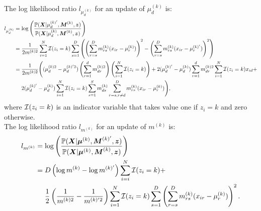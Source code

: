 \documentclass[a4paper,11pt]{article}
\def\M{\boldsymbol{M}}
\def\X{\boldsymbol{X}}
\def\bmu{\boldsymbol{\mu}}
\def\p{\mathbb{P}}
\begin{document}
The log likelihood ratio $l_{\mu_d^{(k)}}$ for an update of $\mu_d^{(k)}$ is:
\begin{align*}
l_{\mu_d^{(k)}} &= \log \left( \frac{\p(\X | \mu_d^{(k)'}, \M^{(k)}, \boldsymbol z )}{\p(\X | \mu_d^{(k)}, \M^{(k)}, \boldsymbol z )} \right) \\
&= \frac{1}{2m^{(k)2}}\sum_{i=1}^N {\cal I}(z_i = k) \sum_{s = 1}^{D}\left( \left(\sum_{r = s}^{D}m_{rs}^{(k)} (x_{ir} - \mu_r^{(k)}) \right)^2- \left(\sum_{r = s}^{D}m_{rs}^{(k)} (x_{ir} - \mu_r^{(k)'}) \right)^2 \right)\\
&= \begin{aligned}[t]
& \frac{1}{2m^{(k)2}}\Bigg((\mu_d^{(k)2} - \mu_d^{(k)'2}) \left( \sum_{r=1}^{d} m_{dr}^{(k)2} \right) \left(\sum_{i=1}^N {\cal I}(z_i = k)\right) +
 2(\mu_d^{(k)'} -\mu_d^{(k)}) \sum_{r=1}^d m_{dr}^{(k)2} \sum_{i=1}^N {\cal I}(z_i = k) x_{id} + \\
&   2(\mu_d^{(k)'} -\mu_d^{(k)}) \sum_{i=1}^N {\cal I}(z_i = k) \sum_{s=1}^{S} m_{ds}^{(k)} \sum_{r=s, r \neq d}^{D} m_{rs}^{(k)}(x_{ir} - \mu_r^{(k)}) \Bigg),
 \end{aligned}
\end{align*}
where ${\cal I}(z_i = k)$ is an indicator variable that takes value one if $z_i = k$ and zero otherwise.\\
The log likelihood ratio $l_{m^{(k)}}$ for an update of $m^{(k)}$ is:
\begin{align*}
l_{m^{(k)}} &= \log \left( \frac{\p(\X | \bmu^{(k)}, \M^{(k)'}, \boldsymbol z )}{\p(\X | \bmu^{(k)}, \M^{(k)}, \boldsymbol z )} \right) \\
 &= \begin{aligned}[t]
    & D\left(\log m^{(k)} - \log m^{(k)'}\right) \sum_{i=i}^N {\cal I}(z_i = k) + \\
    & \frac{1}{2}\left(\frac{1}{m^{(k)2}} - \frac{1}{m^{(k)'2}} \right) \sum_{i=1}^N {\cal I}(z_i = k) \sum_{s = 1}^{D} \left(\sum_{r = s}^{D}m_{rs}^{(k)} (x_{ir} - \mu_r^{(k)}) \right)^2.
\end{aligned}
\end{align*}
\end{document}
